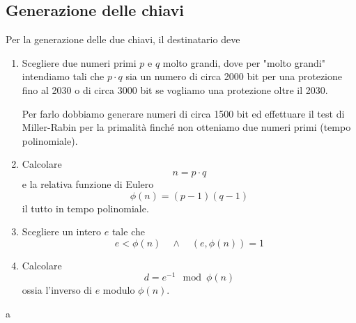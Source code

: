 \subsection{Generazione delle chiavi}
Per la generazione delle due chiavi, il destinatario deve
\begin{enumerate}
	\item Scegliere due numeri primi $p$ e $q$ molto grandi, dove per "molto grandi" intendiamo tali che $p \cdot q$
	      sia un numero di circa 2000 bit per una protezione fino al 2030 o di circa 3000 bit se vogliamo una
	      protezione oltre il 2030.

	      Per farlo dobbiamo generare numeri di circa 1500 bit ed effettuare il test di Miller-Rabin per la
	      primalit\`a finch\'e non otteniamo due numeri primi (tempo polinomiale).
	\item Calcolare
	      \[ n = p \cdot q \]
	      e la relativa funzione di Eulero
	      \[ \phi(n) = (p - 1)(q - 1) \]
	      il tutto in tempo polinomiale.
	\item Scegliere un intero $e$ tale che
	      \[ e < \phi(n) \quad \wedge \quad (e, \phi(n)) = 1 \]
	\item Calcolare
	      \[ d = e^{-1} \mod{\phi(n)} \]
	      ossia l'inverso di $e$ modulo $\phi(n)$.
\end{enumerate}
a